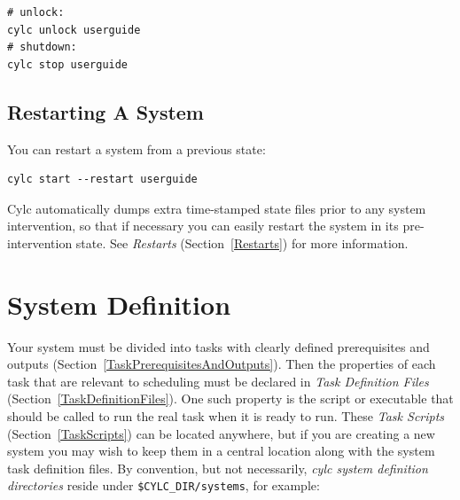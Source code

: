 \documentclass[11pt,a4paper]{article}
\begin{document}
\begin{lstlisting}
# unlock:
cylc unlock userguide
# shutdown:
cylc stop userguide
\end{lstlisting}

\subsection{Restarting A System}
\label{QuickRestartingASystem}

You can restart a system from a previous state:

\begin{lstlisting}
cylc start --restart userguide
\end{lstlisting}

Cylc automatically dumps extra time-stamped state files prior to any
system intervention, so that if necessary you can easily restart the
system in its pre-intervention state.  See {\em Restarts}
(Section~\ref{Restarts}) for more information.


\pagebreak
\section{System Definition} 
\label{SystemDefinition}


Your system must be divided into tasks with clearly defined
prerequisites and outputs (Section~\ref{TaskPrerequisitesAndOutputs}). Then
the properties of each task that are relevant to scheduling must be
declared in {\em Task Definition Files}
(Section~\ref{TaskDefinitionFiles}). One such property is the script or
executable that should be called to run the real task when
it is ready to run. These {\em Task Scripts} (Section~\ref{TaskScripts})
can be located anywhere, but if you are creating a new system you may
wish to keep them in a central location along with the system task
definition files.  By convention, but not necessarily, {\em cylc system
definition directories} reside under \lstinline=$CYLC_DIR/systems=, for
example:

\lstset{language=bash}
\end{document}
